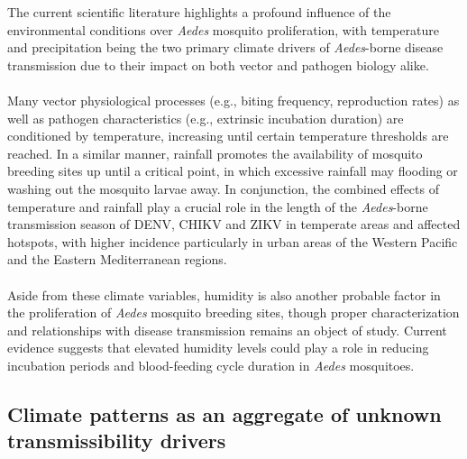 \documentclass[10pt,twocolumn]{wlscirep}
\begin{document}
The current scientific literature highlights a profound influence of the environmental conditions over \textit{Aedes} mosquito proliferation, with temperature and precipitation being the two primary climate drivers of \textit{Aedes}-borne disease transmission due to their impact on both vector and pathogen biology alike.
\\
\\
Many vector physiological processes (e.g., biting frequency, reproduction rates) as well as pathogen characteristics (e.g., extrinsic incubation duration) are conditioned by temperature, increasing until certain temperature thresholds are reached\cite{mordecai_2019}. In a similar manner, rainfall promotes the availability of mosquito breeding sites up until a critical point, in which excessive rainfall may flooding or washing out the mosquito larvae away\cite{paaijmans_2007}. In conjunction, the combined effects of temperature and rainfall play a crucial role in the length of the \textit{Aedes}-borne transmission season of DENV, CHIKV and ZIKV in temperate areas and affected hotspots, with higher incidence particularly in urban areas of the Western Pacific and the Eastern Mediterranean regions\cite{colon-gonzalez_2021}.
\\
\\
Aside from these climate variables, humidity is also another probable factor in the proliferation of \textit{Aedes} mosquito breeding sites, though proper characterization and relationships with disease transmission remains an object of study. Current evidence suggests that elevated humidity levels could play a role in reducing incubation periods and blood-feeding cycle duration in \textit{Aedes} mosquitoes\cite{descloux_2012}.

\subsection{Climate patterns as an aggregate of unknown transmissibility drivers} \label{sec-climate-patterns}
\end{document}
